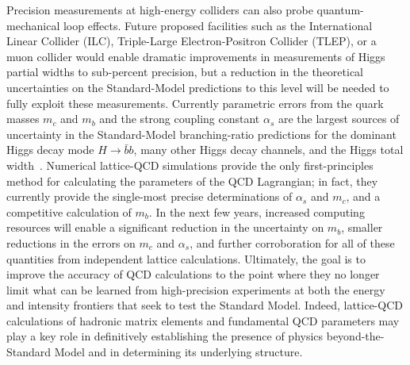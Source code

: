 Precision measurements at high-energy colliders can also probe
quantum-mechanical loop effects.  Future proposed facilities such as the
International Linear Collider (ILC), Triple-Large Electron-Positron Collider
(TLEP), or a muon collider would enable dramatic improvements in measurements
of Higgs partial widths to sub-percent precision, but a reduction in the
theoretical uncertainties on the Standard-Model predictions to this level will
be needed to fully exploit these measurements.  Currently parametric errors
from the quark masses $m_c$ and $m_b$ and the strong coupling constant
$\alpha_s$ are the largest sources of uncertainty in the Standard-Model
branching-ratio predictions for the dominant Higgs decay mode $H \to
\bar{b}b$, many other Higgs decay channels, and the Higgs total
width~\cite{Denner:2011mq}.  Numerical lattice-QCD simulations provide the
only first-principles method for calculating the parameters of the QCD
Lagrangian; in fact, they currently provide the single-most precise
determinations of $\alpha_s$ and $m_c$, and a competitive calculation of
$m_b$.  In the next few years, increased computing resources will enable a
significant reduction in the uncertainty on $m_b$, smaller reductions in the
errors on $m_c$ and $\alpha_s$, and further corroboration for all of these
quantities from independent lattice calculations.  Ultimately, the goal is to
improve the accuracy of QCD calculations to the point where they no longer
limit what can be learned from high-precision experiments at both the energy
and intensity frontiers that seek to test the Standard Model.  Indeed,
lattice-QCD calculations of hadronic matrix elements and fundamental QCD
parameters may play a key role in definitively establishing the presence of
physics beyond-the-Standard Model and in determining its underlying structure.

